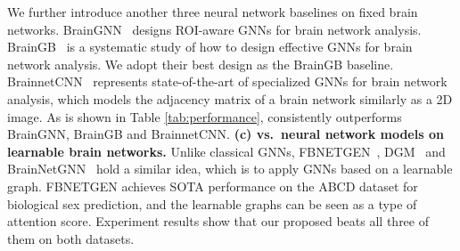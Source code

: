 We further introduce another three neural network baselines on fixed brain networks. BrainGNN~\citep{li2020braingnn} designs ROI-aware GNNs for brain network analysis. BrainGB~\citep{braingb} is a systematic study of how to design effective GNNs for brain network analysis. We adopt their best design as the BrainGB baseline. BrainnetCNN~\citep{BrainNetCNN} represents state-of-the-art of specialized GNNs for brain network analysis, which models the adjacency matrix of a brain network similarly as a 2D image. As is shown in Table \ref{tab:performance}, \methodtable consistently outperforms BrainGNN, BrainGB and BrainnetCNN. \textbf{(c) \methodtable vs.~neural network models on learnable brain networks.} Unlike classical GNNs, FBNETGEN~\citep{kan2022fbnetgen}, DGM~\citep{9763421} and BrainNetGNN~\citep{a14030075} hold a similar idea, which is to apply GNNs based on a learnable graph. FBNETGEN achieves SOTA performance on the ABCD dataset for biological sex prediction, and the learnable graphs can be seen as a type of attention score. Experiment results show that our proposed \methodtable beats all three of them on both datasets.

